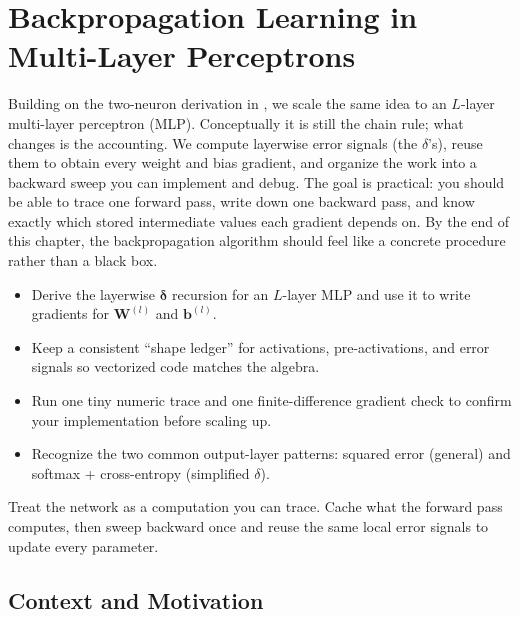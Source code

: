 \section{Backpropagation Learning in Multi-Layer Perceptrons}\label{chap:backprop}
\graphicspath{{assets/lec4/}}

Building on the two\hyp{}neuron derivation in , we scale the same idea to an \(L\)\hyp{}layer multi\hyp{}layer perceptron (MLP). Conceptually it is still the chain rule; what changes is the accounting. We compute layerwise error signals (the \(\delta\)'s), reuse them to obtain every weight and bias gradient, and organize the work into a backward sweep you can implement and debug. The goal is practical: you should be able to trace one forward pass, write down one backward pass, and know exactly which stored intermediate values each gradient depends on. By the end of this chapter, the backpropagation algorithm should feel like a concrete procedure rather than a black box.

\begin{tcolorbox}[summarybox, title={Learning Outcomes}]
\begin{itemize}
    \item Derive the layerwise \(\boldsymbol{\delta}\) recursion for an \(L\)\hyp{}layer MLP and use it to write gradients for \(\mathbf{W}^{(l)}\) and \(\mathbf{b}^{(l)}\).
    \item Keep a consistent ``shape ledger'' for activations, pre\hyp{}activations, and error signals so vectorized code matches the algebra.
    \item Run one tiny numeric trace and one finite\hyp{}difference gradient check to confirm your implementation before scaling up.
    \item Recognize the two common output\hyp{}layer patterns: squared error (general) and softmax + cross\hyp{}entropy (simplified \(\delta\)).
\end{itemize}
\end{tcolorbox}

\begin{tcolorbox}[summarybox, title={Design motif}]
Treat the network as a computation you can trace. Cache what the forward pass computes, then sweep backward once and reuse the same local error signals to update every parameter.
\end{tcolorbox}

\subsection{Context and Motivation}
\label{sec:backprop_context_and_motivation}

